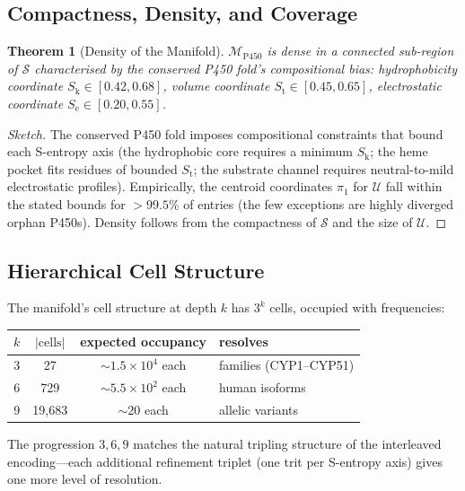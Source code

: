\documentclass[11pt,twocolumn,a4paper]{article}
\newtheorem{theorem}{Theorem}[section]
\theoremstyle{definition}
\theoremstyle{remark}
\newcommand{\Sk}{S_{\mathrm{k}}}
\newcommand{\St}{S_{\mathrm{t}}}
\newcommand{\Se}{S_{\mathrm{e}}}
\newcommand{\Sspace}{\mathcal{S}}
\begin{document}
\subsection{Compactness, Density, and Coverage}

\begin{theorem}[Density of the Manifold]
\label{thm:density}
$\mathcal{M}_{\mathrm{P450}}$ is dense in a connected sub-region of $\Sspace$ characterised by the conserved P450 fold's compositional bias: hydrophobicity coordinate $\Sk \in [0.42, 0.68]$, volume coordinate $\St \in [0.45, 0.65]$, electrostatic coordinate $\Se \in [0.20, 0.55]$.
\end{theorem}

\begin{proof}[Sketch]
The conserved P450 fold imposes compositional constraints that bound each S-entropy axis (the hydrophobic core requires a minimum $\Sk$; the heme pocket fits residues of bounded $\St$; the substrate channel requires neutral-to-mild electrostatic profiles). Empirically, the centroid coordinates $\pi_1$ for $\mathcal{U}$ fall within the stated bounds for $> 99.5\%$ of entries (the few exceptions are highly diverged orphan P450s). Density follows from the compactness of $\Sspace$ and the size of $\mathcal{U}$.
\end{proof}

\subsection{Hierarchical Cell Structure}

The manifold's cell structure at depth $k$ has $3^k$ cells, occupied with frequencies:
\begin{center}
\small
\begin{tabular}{rccl}
\toprule
$k$ & $|\mathrm{cells}|$ & expected occupancy & resolves \\
\midrule
3 & 27 & $\sim 1.5 \times 10^4$ each & families (CYP1--CYP51) \\
6 & 729 & $\sim 5.5 \times 10^2$ each & human isoforms \\
9 & 19{,}683 & $\sim 20$ each & allelic variants \\
\bottomrule
\end{tabular}
\end{center}

The progression $3, 6, 9$ matches the natural tripling structure of the interleaved encoding---each additional refinement triplet (one trit per S-entropy axis) gives one more level of resolution.
\end{document}

